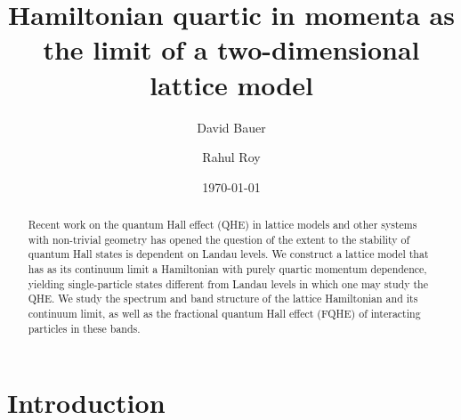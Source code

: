 \documentclass[aps,twocolumn,letterpaper,twoside,nobalancelastpage,groupedaddress,amsmath,amssymb,floatfix,citeautoscript]{revtex4-1}
\begin{document}
\def \Ns {\mathbb{N}}
\def \Rs {\mathbb{R}}
\def \Zs {\mathbb{Z}}
\def \Qs {\mathbb{Q}}
\def \Cs {\mathbb{C}}
\def \id {\mathbb{I}}

\def \bfq {{\bf q}}
\def \bfp {{\bf p}}
\def \bfx {{\bf x}}
\def \bfy {{\bf y}}
\def \bfz {{\bf z}}
\def \bfr {{\bf r}}
\def \bfk {{\bf k}}
\def \bfn {{\bf n}}
\def \bfb {{\bf b}}


\def \hatq {\widehat{q}}
\def \hatp {\widehat{p}}
\def \hata {\widehat{a}}
\def \hatadag {\widehat{a}^{\dagger}}
\def \wtN {\widetilde{N}}

\def \ve {\varepsilon}
\def \vth {\vartheta}



\title{Hamiltonian quartic in momenta as the limit of a two-dimensional lattice model}
\author{David Bauer}

\author{Rahul Roy}

\date{\today}
\begin{abstract}
Recent work on the quantum Hall effect (QHE) in lattice models and other systems with non-trivial geometry has opened the question of the extent to the stability of quantum Hall states is dependent on Landau levels. We construct a lattice model that has as its continuum limit a Hamiltonian with purely quartic momentum dependence, yielding single-particle states different from Landau levels in which one may study the QHE. We study the spectrum and band structure of the lattice Hamiltonian and its continuum limit, as well as the fractional quantum Hall effect (FQHE) of interacting particles in these bands. 
\end{abstract}


\maketitle

\section{Introduction}
\end{document}
